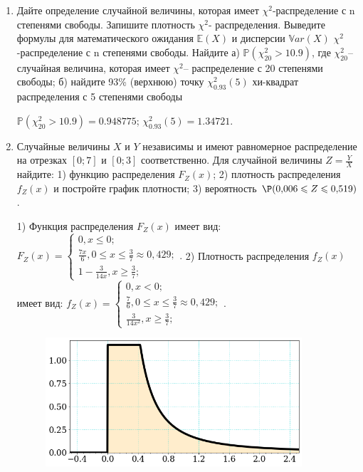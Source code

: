 \documentclass[a4paper,14pt]{article}
\begin{document}
\begin{enumerate}


\item


Дайте определение случайной величины, которая имеет $\chi ^{2}$-распределение с n степенями свободы.
Запишите плотность $\chi ^{2}$- распределения. Выведите формулы для математического ожидания $\mathbb{E}(X)$ и дисперсии $\mathbb{V}ar(X)$ $\chi ^{2}$-распределение с n степенями свободы. Найдите а) $\mathbb{P}(\chi _{20}^{2} > 10.9)$, где $\chi _{20}^{2}$–случайная величина, которая имеет $\chi ^{2}$– распределение с 20 степенями свободы; б) найдите 93\%
(верхнюю) точку $\chi _{0.93}^{2} (5)$ хи-квадрат распределения с 5 степенями свободы




$\mathbb{P}(\chi _{20}^{2} > 10.9) =  0.948775$; $\chi _{0.93}^{2} (5) = 1.34721$.


\item



Случайные величины $X$ и $Y$ независимы и имеют равномерное
распределение на отрезках $[0;7]$ и $[0;3]$ соответственно. Для случайной величины $Z=\frac{Y}{X}$ найдите: 
1) функцию распределения $F_Z(x)$;
2) плотность распределения $f_Z(x)$ и постройте график плотности;
3) вероятность $\P(0,\!006\leqslant Z\leqslant 0,\!519)$.




1) Функция распределения $F_Z(x)$ имеет вид:
$
F_Z(x)=\left\{
\begin{array}{l}
0, x\leqslant 0;\\
\frac{7 x}{6}, 0\leqslant x\leqslant \frac{3}{7}\approx 0,\!429;\\
1 - \frac{3}{14 x}, x\geqslant\frac{3}{7};
\end{array}.
\right.
$
2) Плотность распределения $f_Z(x)$ имеет вид:
$
f_Z(x)=\left\{
\begin{array}{l}
0, x<0;\\
\frac{7}{6}, 0\leqslant x\leqslant \frac{3}{7}\approx 0,\!429;\\
\frac{3}{14 x^{2}}, x\geqslant\frac{3}{7};
\end{array}.
\right.
$


\begin{figure}[H]
    \includegraphics[width=0.9\textwidth]{2_53d18}
\end{figure}



\end{enumerate}
\end{document}
